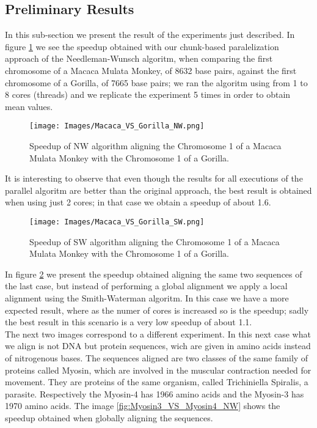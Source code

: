 \documentclass[journal]{IEEEtran}
\begin{document}
\subsection{Preliminary Results}

In this sub-section we present the result of the experiments just described. In figure \ref{fig:Macaca_VS_Gorilla_NW} we see the speedup obtained with our chunk-based paralelization approach of the Needleman-Wunsch algoritm, when comparing the first chromosome of a Macaca Mulata Monkey, of 8632 base pairs, against the first chromosome of a Gorilla, of 7665 base pairs; we ran the algoritm using from 1 to 8 cores (threads) and we replicate the experiment 5 times in order to obtain mean values. 

\begin{figure}[h]
  \begin{center}
    \texttt{[image: Images/Macaca\_VS\_Gorilla\_NW.png]}
  \end{center}
  \caption{Speedup of NW algorithm aligning the Chromosome 1 of a Macaca Mulata Monkey with the Chromosome 1 of a Gorilla.}
  \label{fig:Macaca_VS_Gorilla_NW}
\end{figure}

It is interesting to observe that even though the results for all executions of the parallel algoritm are better than the original approach, the best result is obtained when using just 2 cores; in that case we obtain a speedup of about 1.6.    

\begin{figure}[h]
  \begin{center}
    \texttt{[image: Images/Macaca\_VS\_Gorilla\_SW.png]}
  \end{center}
  \caption{Speedup of SW algorithm aligning the Chromosome 1 of a Macaca Mulata Monkey with the Chromosome 1 of a Gorilla.}
  \label{fig:Macaca_VS_Gorilla_SW}
\end{figure}

In figure \ref{fig:Macaca_VS_Gorilla_SW} we present the speedup obtained aligning the same two sequences of the last case, but instead of performing a global alignment we apply a local alignment using the Smith-Waterman algoritm. In this case we have a more expected result, where as the numer of cores is increased so is the speedup; sadly the best result in this scenario is a very low speedup of about 1.1. \\

The next two images correspond to a different experiment. In this next case what we align is not DNA but protein sequences, wich are given in amino acids instead of nitrogenous bases. The sequences aligned are two classes of the same family of proteins called Myosin, which are involved in the muscular contraction needed for movement. They are proteins of the same organism, called Trichiniella Spiralis, a parasite. Respectively the Myosin-4 has 1966 amino acids and the Myosin-3 has 1970 amino acids. The image \ref{fig:Myosin3_VS_Myosin4_NW} shows the speedup obtained when globally aligning the sequences. 
\end{document}

